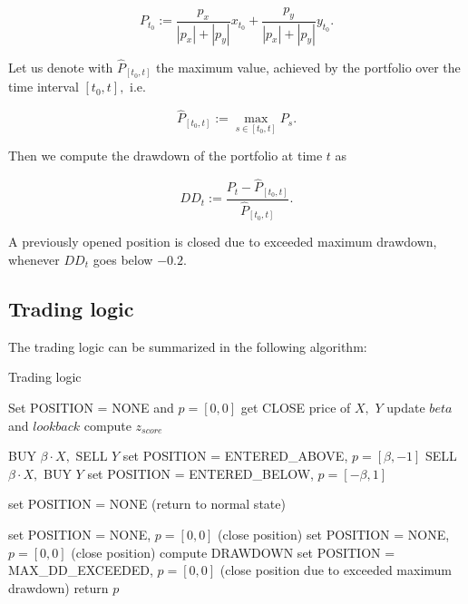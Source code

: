 \documentclass{paper}
\begin{document}
\begin{displaymath}
P_{t_0} := \frac{p_x}{|p_x| + |p_y|}x_{t_0} + \frac{p_y}{|p_x| + |p_y|}y_{t_0}.
\end{displaymath}

Let us denote with $\hat P_{[t_0,t]}$ the maximum value, achieved by the portfolio over the time interval $[t_0,t],$ i.e.

\begin{displaymath}
\hat P_{[t_0,t]} := \max_{s \in [t_0,t]} P_s.
\end{displaymath}

Then we compute the drawdown of the portfolio at time $t$ as 

\begin{displaymath}
DD_t := \frac{P_t - \hat P_{[t_0,t]}}{\hat P_{[t_0,t]}}.
\end{displaymath}

A previously opened position is closed due to exceeded maximum drawdown, whenever $DD_t$ goes below $-0.2.$




\subsection{Trading logic}
The trading logic can be summarized in the following algorithm:
\begin{algorithm}[H]
\caption{Trading logic}
\label{trading_logic}
\begin{boxedminipage}{117mm}
\begin{algorithmic}[1]
\STATE Set POSITION = NONE and $p = [0,0]$
\STATE get CLOSE price of $X,$ $Y$
\STATE update $beta$ and $lookback$
\ENDIF
\STATE compute $z_{score}$

		\STATE BUY $\beta \cdot X,$ SELL $Y$
		\STATE set POSITION = ENTERED\_ABOVE, $p = [\beta, -1]$
	\ENDIF
		\STATE SELL $\beta \cdot X,$ BUY $Y$
		\STATE set POSITION = ENTERED\_BELOW, $p = [-\beta, 1]$
	\ENDIF
\ENDIF

	\STATE set POSITION = NONE (return to normal state)
\ENDIF

		\STATE set POSITION = NONE, $p = [0,0]$ (close position)
		\STATE set POSITION = NONE, $p = [0,0]$ (close position)
	\ELSE
		\STATE compute DRAWDOWN
			\STATE set POSITION = MAX\_DD\_EXCEEDED, $p = [0,0]$
			\STATE (close position due to exceeded maximum drawdown)
		\ENDIF
	\ENDIF
\ENDIF
\STATE return $p$
\ENDFOR
\end{algorithmic}
\end{boxedminipage}
\end{algorithm}
\end{document}

